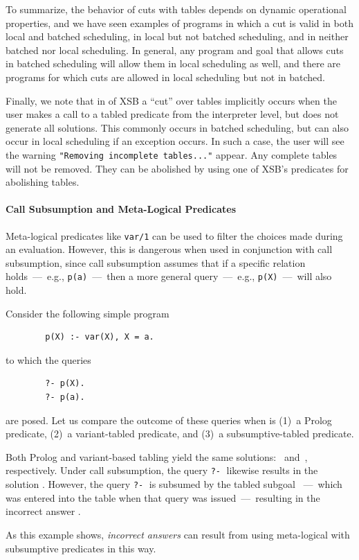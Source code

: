 To summarize, the behavior of cuts with tables depends on dynamic
operational properties, and we have seen examples of programs in which
a cut is valid in both local and batched scheduling, in local but not
batched scheduling, and in neither batched nor local scheduling.  In
general, any program and goal that allows cuts in batched scheduling
will allow them in local scheduling as well, and there are programs
for which cuts are allowed in local scheduling but not in batched.

Finally, we note that in \version{} of XSB a ``cut'' over tables
implicitly occurs when the user makes a call to a tabled predicate
from the interpreter level, but does not generate all solutions.  This
commonly occurs in batched scheduling, but can also occur in local
scheduling if an exception occurs.  In such a case, the user will see
the warning {\tt "Removing incomplete tables..."} appear.  Any
complete tables will not be removed.  They can be abolished by using
one of XSB's predicates for abolishing tables.

\paragraph{Call Subsumption and Meta-Logical Predicates}

Meta-logical predicates like {\tt var/1} can be used to filter the
choices made during an evaluation.  However, this is dangerous when
used in conjunction with call subsumption, since call subsumption
assumes that if a specific relation holds~---~e.g.,
\texttt{p(a)}~---~then a more general query~---~e.g.,
\texttt{p(X)}~---~will also hold.

\begin{example}\label{example:sub-fail}
Consider the following simple program
\begin{verbatim}
        p(X) :- var(X), X = a.
\end{verbatim}
to which the queries
\begin{verbatim}
        ?- p(X).
        ?- p(a).
\end{verbatim}
are posed.  Let us compare the outcome of these queries when
 is (1)~a Prolog predicate, (2)~a variant-tabled predicate,
and (3)~a subsumptive-tabled predicate.

Both Prolog and variant-based tabling yield the same solutions:
\, and\, , respectively.  Under call subsumption,
the query \verb|?-|$\;$ likewise results in the solution
.  However, the query \verb|?-|$\;$  is
subsumed by the tabled subgoal ~---~which was entered into
the table when that query was issued~---~resulting in the incorrect
answer .\fillBox
\end{example}
%
As this example shows, \emph{incorrect answers} can result from using
meta-logical with subsumptive predicates in this way.

